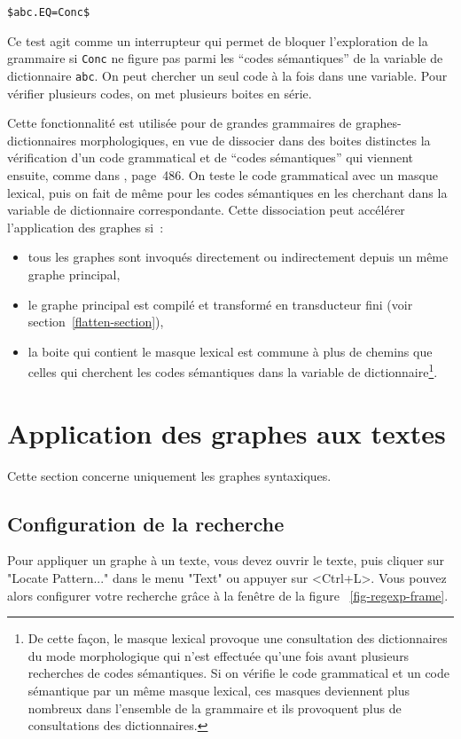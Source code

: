 \bigskip
\noindent \verb+$abc.EQ=Conc$+

\bigskip
\noindent Ce test agit comme un interrupteur qui permet de bloquer l'exploration de la grammaire si \verb+Conc+
ne figure pas parmi les ``codes sémantiques'' de la variable de dictionnaire \verb+abc+. On peut chercher
un seul code à la fois dans une variable. Pour vérifier plusieurs codes, on met plusieurs boites en série.

\bigskip
\noindent Cette fonctionnalité est utilisée pour de grandes grammaires de graphes-dictionnaires morphologiques, en vue de
dissocier dans des boites distinctes la vérification d'un code grammatical et de ``codes sémantiques'' qui viennent ensuite,
comme dans \cite{paumier_nam_2014}, page~486.
On teste le code grammatical avec un masque lexical, puis on fait de même pour les codes sémantiques
en les cherchant dans la variable de dictionnaire correspondante.
Cette dissociation peut accélérer l'application des graphes si~:
\begin{itemize}
\item tous les graphes sont invoqués directement ou indirectement depuis un même graphe principal, 
\item le graphe principal est compilé et transformé en transducteur fini (voir section~\ref{flatten-section}),
\item la boite qui contient le masque lexical est commune à plus de chemins que celles qui cherchent les codes sémantiques
dans la variable de dictionnaire\footnote{De cette façon, le masque lexical provoque une consultation des dictionnaires du mode morphologique qui n'est effectuée qu'une fois avant plusieurs recherches de codes sémantiques.
Si on vérifie le code grammatical et un code sémantique par un même masque lexical, ces masques deviennent plus
nombreux dans l'ensemble de la grammaire et ils provoquent plus de consultations des dictionnaires.}.
\end{itemize}

\section{Application des graphes aux textes}
\label{section-applying-graphs-to-text}
Cette section concerne uniquement les graphes syntaxiques.
\subsection{Configuration de la recherche}
Pour appliquer un graphe à un texte, vous devez ouvrir le texte, puis cliquer sur "Locate
Pattern..." dans le menu "Text" ou appuyer sur <Ctrl+L>. Vous pouvez alors configurer votre
recherche grâce à la fenêtre de la figure
~\ref{fig-regexp-frame}.

